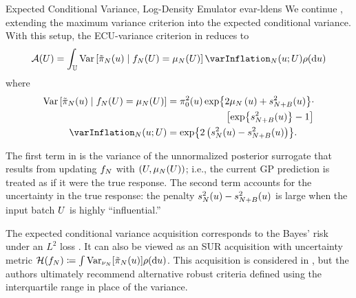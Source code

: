 \documentclass[12pt]{article}
\begin{document}
\begin{examplebox}
{Expected Conditional Variance, Log-Density Emulator}
{evar-ldens}
We continue , extending the maximum variance criterion into the expected conditional
variance. With this setup, the ECU-variance criterion in  reduces to
\begin{equation}
\acq(\ParBatch) = \int_{\parSpace} 
\Var\left[\postEm(\Par) \given \targetEm(\ParBatch) = \emMean[\Ndesign](\ParBatch) \right] \varInflation_{\Ndesign}(\Par; \ParBatch)
\weightdens(\d\Par)
\label{eq:acq-intvar-saa-ldens}
\end{equation}
where
\begin{align*}
\Var\left[\postEm(\Par) \given \targetEm(\ParBatch) = \emMean[\Ndesign](\ParBatch) \right]
&= \priorDens^2(\Par) \Exp{2\emMean[\Ndesign]\left(\Par\right) + \emVar[\Naugment](\Par)} \cdot \\
&\qquad\qquad\qquad \left[\Exp{\emVar[\Naugment](\Par)} - 1 \right] \\
\varInflation_{\Ndesign}(\Par; \ParBatch)
&= \Exp{2\left(\emVar[\Ndesign](\Par) - \emVar[\Naugment](\Par)\right)}.
\end{align*}

The first term in  is the variance of the unnormalized posterior surrogate
that results from updating $\targetEm$ with $(\ParBatch, \emMean(\ParBatch))$; 
i.e., the current GP prediction is treated as if it were the true response.
The second term accounts for the uncertainty in the true response: the penalty
$\emVar[\Ndesign](\Par) - \emVar[\Naugment](\Par)$ is large when the input batch $\ParBatch$ is highly 
``influential.''

The expected conditional variance acquisition corresponds to the Bayes' risk under an $L^2$ 
loss \citet{VehtariParallelGP}. It can also be viewed as an SUR acquisition with uncertainty metric
$\surmetric(\targetEm) \Def \int \Var_{\emDist}[\postEm(\Par)] \weightdens(\d\Par)$.
This acquisition is considered in \citet{VehtariParallelGP}, but the authors ultimately recommend
alternative robust criteria defined using the interquartile range in place of the variance.
\end{examplebox}
\end{document}
